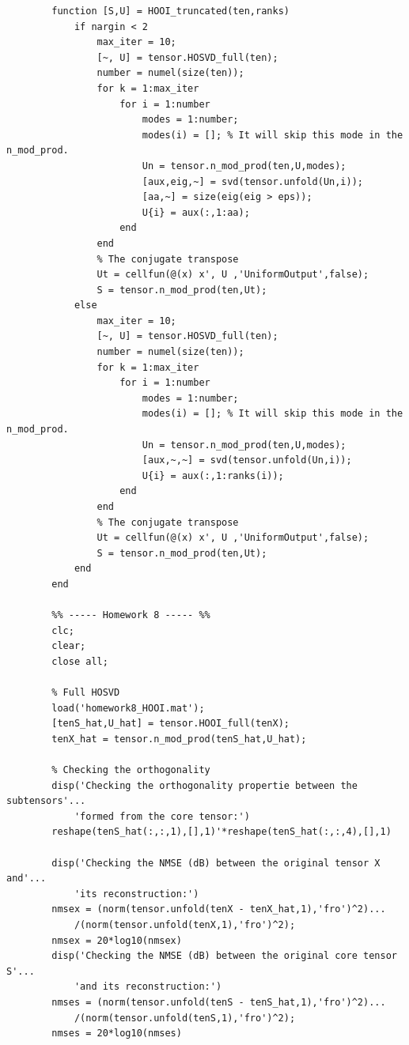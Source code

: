 \documentclass[a4paper,10pt]{article}
\begin{document}
\begin{verbatim}
        function [S,U] = HOOI_truncated(ten,ranks)
            if nargin < 2
                max_iter = 10;
                [~, U] = tensor.HOSVD_full(ten);
                number = numel(size(ten));
                for k = 1:max_iter
                    for i = 1:number
                        modes = 1:number;
                        modes(i) = []; % It will skip this mode in the n_mod_prod.
                        Un = tensor.n_mod_prod(ten,U,modes);
                        [aux,eig,~] = svd(tensor.unfold(Un,i));
                        [aa,~] = size(eig(eig > eps));
                        U{i} = aux(:,1:aa);
                    end
                end
                % The conjugate transpose
                Ut = cellfun(@(x) x', U ,'UniformOutput',false);
                S = tensor.n_mod_prod(ten,Ut); 
            else
                max_iter = 10;
                [~, U] = tensor.HOSVD_full(ten);
                number = numel(size(ten));
                for k = 1:max_iter
                    for i = 1:number
                        modes = 1:number;
                        modes(i) = []; % It will skip this mode in the n_mod_prod.
                        Un = tensor.n_mod_prod(ten,U,modes);
                        [aux,~,~] = svd(tensor.unfold(Un,i));
                        U{i} = aux(:,1:ranks(i));
                    end
                end
                % The conjugate transpose
                Ut = cellfun(@(x) x', U ,'UniformOutput',false);
                S = tensor.n_mod_prod(ten,Ut); 
            end    
        end

        %% ----- Homework 8 ----- %%
        clc;
        clear;
        close all;

        % Full HOSVD
        load('homework8_HOOI.mat');
        [tenS_hat,U_hat] = tensor.HOOI_full(tenX);
        tenX_hat = tensor.n_mod_prod(tenS_hat,U_hat);

        % Checking the orthogonality
        disp('Checking the orthogonality propertie between the subtensors'...
            'formed from the core tensor:')
        reshape(tenS_hat(:,:,1),[],1)'*reshape(tenS_hat(:,:,4),[],1)

        disp('Checking the NMSE (dB) between the original tensor X and'...
            'its reconstruction:')
        nmsex = (norm(tensor.unfold(tenX - tenX_hat,1),'fro')^2)...
            /(norm(tensor.unfold(tenX,1),'fro')^2);
        nmsex = 20*log10(nmsex)
        disp('Checking the NMSE (dB) between the original core tensor S'...
            'and its reconstruction:')
        nmses = (norm(tensor.unfold(tenS - tenS_hat,1),'fro')^2)...
            /(norm(tensor.unfold(tenS,1),'fro')^2);
        nmses = 20*log10(nmses)


\end{verbatim}
\end{document}
